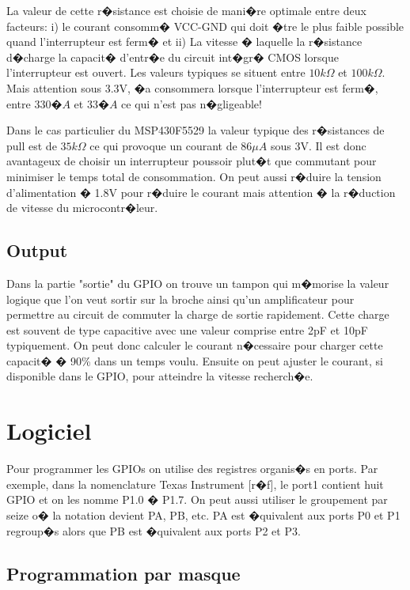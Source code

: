 La valeur de cette r�sistance est choisie de mani�re optimale entre deux facteurs: i) le courant consomm� VCC-GND qui doit �tre le plus faible possible quand l'interrupteur est ferm� et ii) La vitesse � laquelle la r�sistance d�charge la capacit� d'entr�e du circuit int�gr� CMOS lorsque l'interrupteur est ouvert. Les valeurs typiques se situent entre $10k\Omega$ et $100k\Omega$. Mais attention sous 3.3V, �a consommera lorsque l'interrupteur est ferm�, entre $330�A$ et $33�A$ ce qui n'est pas n�gligeable!

Dans le cas particulier du MSP430F5529 la valeur typique des r�sistances de pull est de $35k\Omega$ ce qui provoque un courant de $86\mu A$ sous 3V. Il est donc avantageux de choisir un interrupteur poussoir plut�t que commutant pour minimiser le temps total de consommation. On peut aussi r�duire la tension d'alimentation � 1.8V pour r�duire le courant mais attention � la r�duction de vitesse du microcontr�leur.

\subsection{Output}

Dans la partie "sortie" du GPIO on trouve un tampon qui m�morise la valeur logique que l'on veut sortir sur la broche ainsi qu'un amplificateur pour permettre au circuit de commuter la charge de sortie rapidement. Cette charge est souvent de type capacitive avec une valeur comprise entre 2pF et 10pF typiquement. On peut donc calculer le courant n�cessaire pour charger cette capacit� � 90\% dans un temps voulu. Ensuite on peut ajuster le courant, si disponible dans le GPIO, pour atteindre la vitesse recherch�e.

\section{Logiciel}

Pour programmer les GPIOs on utilise des registres organis�s en ports. Par exemple, dans la nomenclature Texas Instrument [r�f], le port1 contient huit GPIO et on les nomme P1.0 � P1.7. On peut aussi utiliser le groupement par seize o� la notation devient PA, PB, etc. PA est �quivalent aux ports P0 et P1 regroup�s alors que PB est �quivalent aux ports P2 et P3. 

\subsection{Programmation par masque}

